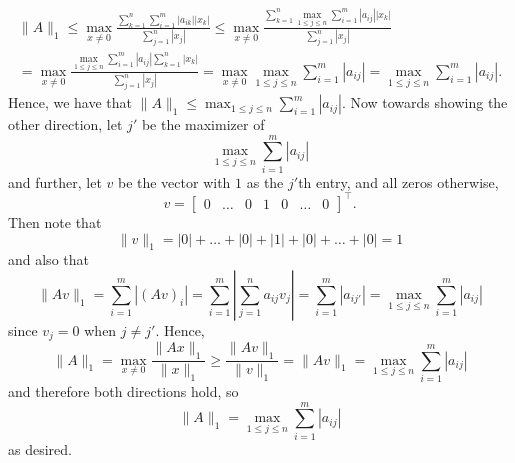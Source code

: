 \documentclass{../../../kin_math}
\begin{document}
\begin{questions}
\begin{enumerate}
\begin{solution}
      \begin{multline*}
        \lVert A \rVert_1 \leq \max_{x \neq 0} \frac{\sum_{k = 1}^n \sum_{i = 1}^m |a_{ik}||x_k|}{\sum_{j = 1}^n |x_j|} \leq \max_{x \neq 0} \frac{\sum_{k = 1}^n \max_{1 \leq j \leq n} \sum_{i = 1}^m |a_{ij}||x_k|}{\sum_{j = 1}^n |x_j|} \\
        = \max_{x \neq 0} \frac{\max_{1 \leq j \leq n} \sum_{i = 1}^m |a_{ij}| \sum_{k = 1}^n |x_k|}{\sum_{j = 1}^n |x_j|} = \max_{x \neq 0} \max_{1 \leq j \leq n} \sum_{i = 1}^m |a_{ij}| = \max_{1 \leq j \leq n} \sum_{i = 1}^m |a_{ij}|.
      \end{multline*}
      Hence, we have that $\lVert A \rVert_1 \leq \max_{1 \leq j \leq n} \sum_{i = 1}^m |a_{ij}|$. Now towards showing the other direction, let $j'$ be the maximizer of
      \begin{equation*}
        \max_{1 \leq j \leq n} \sum_{i = 1}^m |a_{ij}|
      \end{equation*}
      and further, let $v$ be the vector with $1$ as the $j'$th entry, and all zeros otherwise,
      \begin{equation*}
        v = \begin{bmatrix} 0 & \dots & 0 & 1 & 0 & \dots & 0 \end{bmatrix}^\top.
      \end{equation*}
      Then note that
      \begin{equation*}
        \lVert v \rVert_1 = |0| + \dots + |0| + |1| + |0| + \dots + |0| = 1
      \end{equation*}
      and also that
      \begin{equation*}
        \lVert Av \rVert_1 = \sum_{i = 1}^m |(Av)_i| = \sum_{i = 1}^m \left| \sum_{j = 1}^n a_{ij}v_j \right| = \sum_{i = 1}^m \left| a_{ij'} \right| = \max_{1 \leq j \leq n} \sum_{i = 1}^m |a_{ij}|
      \end{equation*}
      since $v_j = 0$ when $j \neq j'$. Hence,
      \begin{equation*}
        \lVert A \rVert_1 = \max_{x \neq 0} \frac{\lVert Ax\rVert_1}{\lVert x \rVert_1} \geq \frac{\lVert Av \rVert_1}{\lVert v \rVert_1} = \lVert Av \rVert_1 = \max_{1 \leq j \leq n} \sum_{i = 1}^m |a_{ij}|
      \end{equation*}
      and therefore both directions hold, so
      \begin{equation*}
        \lVert A \rVert_1 = \max_{1 \leq j \leq n} \sum_{i = 1}^m |a_{ij}|
      \end{equation*}
      as desired.
    \end{solution}

\end{enumerate}
\end{questions}
\end{document}
